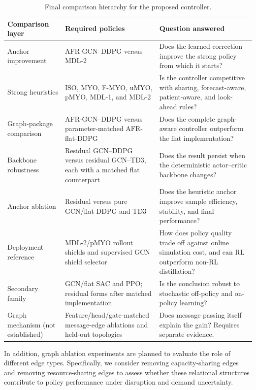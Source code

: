 \documentclass[preprint,review,12pt]{elsarticle}
\begin{document}
\begin{table}[htbp]
\centering
\footnotesize
\caption{Final comparison hierarchy for the proposed controller.}
\label{tab:final_benchmark}
\setlength{\tabcolsep}{3pt}
\renewcommand{\arraystretch}{1.0}
\begin{tabularx}{\textwidth}{p{} p{} X}
\toprule
Comparison layer & Required policies & Question answered \\
\midrule
Anchor improvement & AFR-GCN--DDPG versus MDL-2 & Does the learned correction improve the strong policy from which it starts? \\
Strong heuristics & ISO, MYO, F-MYO, uMYO, pMYO, MDL-1, and MDL-2 & Is the controller competitive with sharing, forecast-aware, patient-aware, and look-ahead rules? \\
Graph-package comparison & AFR-GCN--DDPG versus parameter-matched AFR-flat-DDPG & Does the complete graph-aware controller outperform the flat implementation? \\
Backbone robustness & Residual GCN--DDPG versus residual GCN--TD3, each with a matched flat counterpart & Does the result persist when the deterministic actor--critic backbone changes? \\
Anchor ablation & Residual versus pure GCN/flat DDPG and TD3 & Does the heuristic anchor improve sample efficiency, stability, and final performance? \\
Deployment reference & MDL-2/pMYO rollout shields and supervised GCN shield selector & How does policy quality trade off against online simulation cost, and can RL outperform non-RL distillation? \\
Secondary family & GCN/flat SAC and PPO; residual forms after matched implementation & Is the conclusion robust to stochastic off-policy and on-policy learning? \\
Graph mechanism (not established) & Feature/head/gate-matched message-edge ablations and held-out topologies & Does message passing itself explain the gain? Requires separate evidence. \\
\bottomrule
\end{tabularx}
\end{table}

In addition, graph ablation experiments are planned to evaluate the role of different edge types. Specifically, we consider removing capacity-sharing edges and removing resource-sharing edges to assess whether these relational structures contribute to policy performance under disruption and demand uncertainty.
\end{document}
